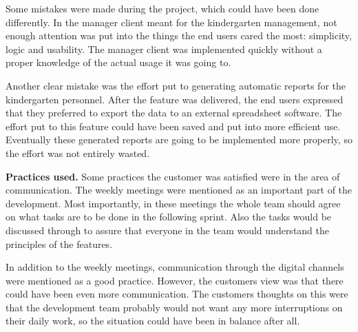 Some mistakes were made during the project, which could have been done differently. In the manager client meant for the kindergarten management, not enough attention was put into the things the end users cared the most: simplicity, logic and usability. The manager client was implemented quickly without a proper knowledge of the actual usage it was going to.

Another clear mistake was the effort put to generating automatic reports for the kindergarten personnel. After the feature was delivered, the end users expressed that they preferred to export the data to an external spreadsheet software. The effort put to this feature could have been saved and put into more efficient use. Eventually these generated reports are going to be implemented more properly, so the effort was not entirely wasted.




\textbf{Practices used.} Some practices the customer was satisfied were in the area of communication. The weekly meetings were mentioned as an important part of the development. Most importantly, in these meetings the whole team should agree on what tasks are to be done in the following sprint. Also the tasks would be discussed through to assure that everyone in the team would understand the principles of the features.

In addition to the weekly meetings, communication through the digital channels were mentioned as a good practice. However, the customers view was that there could have been even more communication. The customers thoughts on this were that the development team probably would not want any more interruptions on their daily work, so the situation could have been in balance after all.



